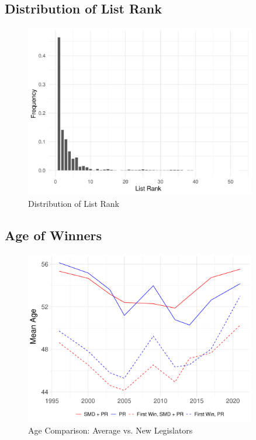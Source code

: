 \documentclass[a4paper, 11pt]{article}
\begin{document}


\newpage

\subsection{Distribution of List Rank}

\begin{figure}[!htbp]
	\includegraphics[width = 0.9\textwidth]{../figure/paper/pr_rank_distribution.pdf}
	\caption{Distribution of List Rank}
	\label{fig:distRank}
\end{figure}

\newpage

\subsection{Age of Winners}

\begin{figure}[!htbp]
	\includegraphics[width = 0.9\textwidth]{../figure/paper/age_first_win.pdf}
	\caption{Age Comparison: Average vs. New Legislators}
	\label{fig:ageFirstWin}
\end{figure}	
\end{document}
